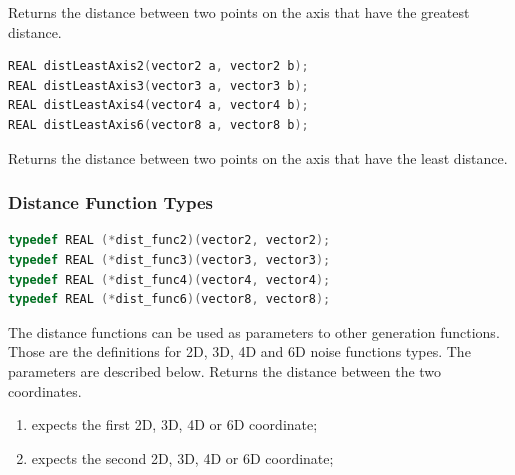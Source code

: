 Returns the distance between two points on the axis that have the greatest distance.

\begin{lstlisting}[caption={Definition of least axis distance functions},label={lst:distance_least_axis_functions},language=OpenCL]
REAL distLeastAxis2(vector2 a, vector2 b);
REAL distLeastAxis3(vector3 a, vector3 b);
REAL distLeastAxis4(vector4 a, vector4 b);
REAL distLeastAxis6(vector8 a, vector8 b);
\end{lstlisting}

Returns the distance between two points on the axis that have the least distance.

\subsubsection{Distance Function Types}

\begin{lstlisting}[caption={Definition of distance function types},label={lst:distance_functions_types},language=OpenCL]
typedef REAL (*dist_func2)(vector2, vector2);
typedef REAL (*dist_func3)(vector3, vector3);
typedef REAL (*dist_func4)(vector4, vector4);
typedef REAL (*dist_func6)(vector8, vector8);
\end{lstlisting}

The distance functions can be used as parameters to other generation
functions. Those are the definitions for 2D, 3D, 4D and 6D noise functions types.
The parameters are described below. Returns the distance between the two coordinates.

\begin{enumerate}
\item expects the first 2D, 3D, 4D or 6D coordinate;
\item expects the second 2D, 3D, 4D or 6D coordinate;
\end{enumerate}
